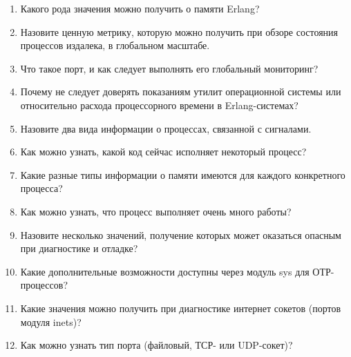 \documentclass[11pt, oneside]{book}   	%
\begin{document}
\begin{enumerate}
	\item Какого рода значения можно получить о памяти Erlang?
	\item Назовите ценную метрику, которую можно получить при обзоре состояния процессов издалека, в глобальном масштабе.
	\item Что такое порт, и как следует выполнять его глобальный мониторинг?
	\item Почему не следует доверять показаниям утилит операционной системы  или  относительно расхода процессорного времени в Erlang-системах?
	\item Назовите два вида информации о процессах, связанной с сигналами.
	\item Как можно узнать, какой код сейчас исполняет некоторый процесс?
	\item Какие разные типы информации о памяти имеются для каждого конкретного процесса?
	\item Как можно узнать, что процесс выполняет очень много работы?
	\item Назовите несколько значений, получение которых может оказаться опасным при диагностике и отладке?
	\item Какие дополнительные возможности доступны через модуль sys для ОТР-процессов?
	\item Какие значения можно получить при диагностике интернет сокетов (портов модуля inets)?
	\item Как можно узнать тип порта (файловый, ТСР- или UDP-сокет)?
\end{enumerate}
\end{document}
